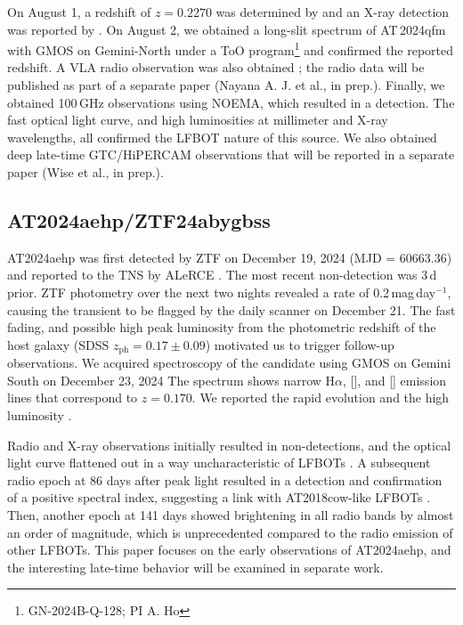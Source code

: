 \documentclass[twocolumn,twocolappendix, linenumbers, trackchanges]{aastex7}
\begin{document}
On August 1, a redshift of $z=0.2270$ was determined by \citet{Gillanders2024_AT2024qfm} and an X-ray detection was reported by \citet{Margutti2024_AT2024qfm}. On August 2, we obtained a long-slit spectrum of AT\,2024qfm with GMOS on Gemini-North under a ToO program\footnote{GN-2024B-Q-128; PI A. Ho} and confirmed the reported redshift. A VLA radio observation was also obtained 
; the radio data will be published as part of a separate paper (Nayana A. J. et al., in prep.). Finally, we obtained 100\,GHz observations using NOEMA, which resulted in a detection. The fast optical light curve, and high luminosities at millimeter and X-ray wavelengths, all confirmed the LFBOT nature of this source. We also obtained deep late-time GTC/HiPERCAM observations that will be reported in a separate paper (Wise et al., in prep.). 

\subsection{AT2024aehp/ZTF24abygbss}

AT2024aehp was first detected by ZTF on December 19, 2024 (MJD = 60663.36) and reported to the TNS by ALeRCE \citep{astro2024aehp_disc}. The most recent non-detection was 3\,d prior.  ZTF photometry over the next two nights revealed a  rate of 0.2\,mag\,day$^{-1}$, causing the transient to be flagged by the daily scanner on December 21. The fast fading,  and possible high peak luminosity from the photometric redshift of the host galaxy (SDSS $z_\mathrm{ph} = 0.17 \pm 0.09$) motivated us to trigger follow-up observations. We acquired spectroscopy of the candidate using GMOS on Gemini South on December 23, 2024 %
The spectrum shows narrow H$\alpha$, [], and [] emission lines that correspond to $z=0.170$. We reported the rapid evolution and the high luminosity  \citep{astro2024aehp_gemini}. 

Radio and X-ray observations initially resulted in non-detections, and the optical light curve flattened out in a way uncharacteristic of LFBOTs \citep{Schroeder2025_AT2024aehp}. A subsequent radio epoch at 86 days after peak light resulted in a detection and confirmation of a positive spectral index, suggesting a link with AT2018cow-like LFBOTs \citep{Schroeder2025_AT2024aehp_Detection}. Then, another epoch at 141 days showed brightening in all radio bands by almost an order of magnitude, which is unprecedented compared to the radio emission of other LFBOTs.  This paper focuses on the early observations of AT2024aehp, and the interesting late-time behavior will be examined in separate work.
\end{document}
